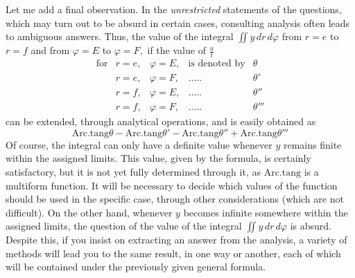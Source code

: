 \documentclass[12pt]{memoir}
\theoremstyle{plain}
\theoremstyle{remark}
\begin{document}
Let me add a final observation. In the \textit{unrestricted} statements of the questions, which may turn out to be absurd in certain cases, consulting analysis often leads to ambiguous answers. Thus, the value of the integral \(\iint y \, dr \, d\varphi\) from \(r=e\) to \(r=f\) and from \(\varphi = E\) to \(\varphi = F,\) if the value of \(\frac{u}{t}\)
\[ \begin{array}{ccccc} \text{for} & r=e,& \varphi = E ,& \text{is denoted by} &\theta \\
& r=e, & \varphi = F,& .\dots. &\theta' \\
& r=f, & \varphi = E,& .\dots. &\theta'' \\
& r=f, & \varphi = F,& .\dots. &\theta''' \end{array} \]
can be extended, through analytical operations, and is easily obtained as
\[ \mathrm{Arc.tang }\theta - \mathrm{Arc.tang }\theta' -\mathrm{Arc.tang }\theta''+\mathrm{Arc.tang }\theta''' \]
Of course, the integral can only have a definite value whenever \(y\) remains finite within the assigned limits. This value, given by the formula, is certainly satisfactory, but it is not yet fully determined through it, as \(\mathrm{Arc.tang}\) is a multiform function. It will be necessary to decide which values of the function should be used in the specific case, through other considerations (which are not difficult). On the other hand, whenever \(y\) becomes infinite somewhere within the assigned limits, the question of the value of the integral \(\iint y \, dr \, d\varphi\) is absurd. Despite this, if you insist on extracting an answer from the analysis, a variety of methods will lead you to the same result, in one way or another, each of which will be contained under the previously given general formula.
\end{document}
